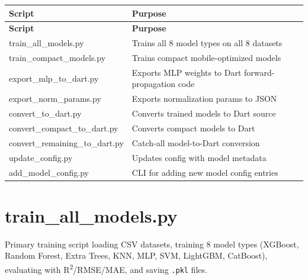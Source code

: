 \documentclass[12pt,a4paper,oneside]{report}
\begin{document}
\begin{longtable}{p{4.5cm} p{11cm}}
\toprule
\textbf{Script} & \textbf{Purpose} \\
\midrule
\endfirsthead
\toprule
\textbf{Script} & \textbf{Purpose} \\
\midrule
\endhead
\bottomrule
\endfoot
train\_all\_models.py & Trains all 8 model types on all 8 datasets \\
train\_compact\_models.py & Trains compact mobile-optimized models \\
export\_mlp\_to\_dart.py & Exports MLP weights to Dart forward-propagation code \\
export\_norm\_params.py & Exports normalization params to JSON \\
convert\_to\_dart.py & Converts trained models to Dart source \\
convert\_compact\_to\_dart.py & Converts compact models to Dart \\
convert\_remaining\_to\_dart.py & Catch-all model-to-Dart conversion \\
update\_config.py & Updates config with model metadata \\
add\_model\_config.py & CLI for adding new model config entries \\
\bottomrule
\end{longtable}

\section{train\_all\_models.py}

Primary training script loading CSV datasets, training 8 model types (XGBoost, Random Forest, Extra Trees, KNN, MLP, SVM, LightGBM, CatBoost), evaluating with R\textsuperscript{2}/RMSE/MAE, and saving \texttt{.pkl} files.
\end{document}
